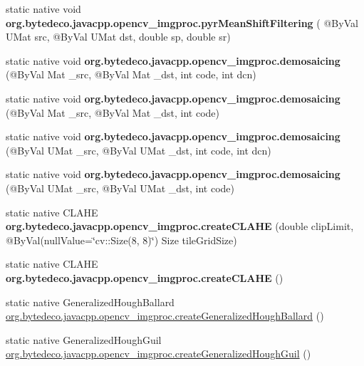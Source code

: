 \begin{DoxyCompactItemize}
static native void {\bfseries org.\+bytedeco.\+javacpp.\+opencv\+\_\+imgproc.\+pyr\+Mean\+Shift\+Filtering} ( @By\+Val U\+Mat src, @By\+Val U\+Mat dst, double sp, double sr)
\item 
\mbox{\label{group__imgproc__filter_ga43b092e00aaf90fda456fb6613004018}} 
static native void {\bfseries org.\+bytedeco.\+javacpp.\+opencv\+\_\+imgproc.\+demosaicing} (@By\+Val Mat \+\_\+src, @By\+Val Mat \+\_\+dst, int code, int dcn)
\item 
\mbox{\label{group__imgproc__filter_ga50b3861706458e84ba09dc916db23498}} 
static native void {\bfseries org.\+bytedeco.\+javacpp.\+opencv\+\_\+imgproc.\+demosaicing} (@By\+Val Mat \+\_\+src, @By\+Val Mat \+\_\+dst, int code)
\item 
\mbox{\label{group__imgproc__filter_gac1393006c09ce6896767536b0c184d21}} 
static native void {\bfseries org.\+bytedeco.\+javacpp.\+opencv\+\_\+imgproc.\+demosaicing} (@By\+Val U\+Mat \+\_\+src, @By\+Val U\+Mat \+\_\+dst, int code, int dcn)
\item 
\mbox{\label{group__imgproc__filter_ga79a9d147081b0e7d93445844fadb8f7f}} 
static native void {\bfseries org.\+bytedeco.\+javacpp.\+opencv\+\_\+imgproc.\+demosaicing} (@By\+Val U\+Mat \+\_\+src, @By\+Val U\+Mat \+\_\+dst, int code)
\item 
\mbox{\label{group__imgproc__filter_ga27340c3d82734719ed4587b492128ce0}} 
static native C\+L\+A\+HE {\bfseries org.\+bytedeco.\+javacpp.\+opencv\+\_\+imgproc.\+create\+C\+L\+A\+HE} (double clip\+Limit, @By\+Val(null\+Value=\char`\"{}cv\+::\+Size(8, 8)\char`\"{}) Size tile\+Grid\+Size)
\item 
\mbox{\label{group__imgproc__filter_ga4c917bd1387042f801f75e5ebec325be}} 
static native C\+L\+A\+HE {\bfseries org.\+bytedeco.\+javacpp.\+opencv\+\_\+imgproc.\+create\+C\+L\+A\+HE} ()
\item 
static native Generalized\+Hough\+Ballard \hyperlink{group__imgproc__filter_ga9184647c04f254c7cfa32edf2cb43bec}{org.\+bytedeco.\+javacpp.\+opencv\+\_\+imgproc.\+create\+Generalized\+Hough\+Ballard} ()
\item 
static native Generalized\+Hough\+Guil \hyperlink{group__imgproc__filter_ga5b2d07c2bc26dfd8aa2daeae1b3adfac}{org.\+bytedeco.\+javacpp.\+opencv\+\_\+imgproc.\+create\+Generalized\+Hough\+Guil} ()

\end{DoxyCompactItemize}
